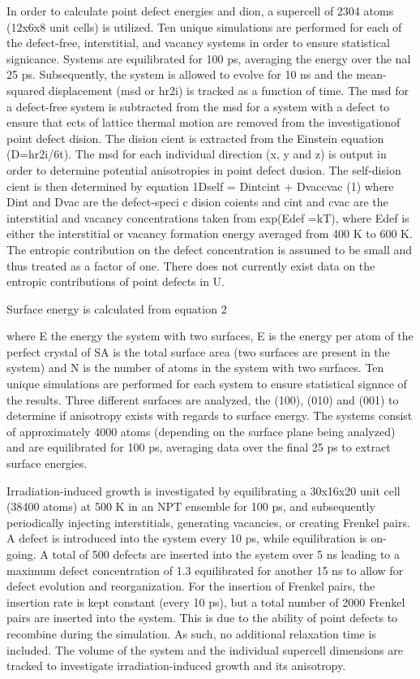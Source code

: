 \documentclass[review]{elsarticle}
\begin{document}
In order to calculate point defect energies and dion, a supercell of 2304 atoms (12x6x8 unit cells) is utilized. Ten unique simulations are performed for each of the defect-free, interstitial, and vacancy systems in order to ensure statistical signicance. Systems are equilibrated for 100 ps, averaging the energy over the nal 25 ps. Subsequently, the system is allowed to evolve for 10 ns and the mean-squared displacement (msd or hr2i) is tracked as a function of time. The msd for a defect-free system is subtracted from the msd for a system with a defect to ensure that ects of lattice thermal motion are removed from the investigationof point defect dision. The dision cient is extracted from the Einstein equation (D=hr2i/6t). The msd for each individual direction (x, y and z) is output in order to determine potential anisotropies in point defect dusion. The self-dision cient is then determined by equation 1Dself = Dintcint + Dvaccvac (1) where Dint and Dvac are the defect-speci c dision coients and cint and cvac are the interstitial and vacancy concentrations taken from exp(Edef =kT), where Edef is either the interstitial or vacancy formation energy averaged from 400 K to 600 K. The entropic contribution on the defect concentration is assumed to be small and thus treated as a factor of one. There does not currently exist data on the entropic contributions of point defects in U.

Surface energy is calculated from equation 2


where E the energy the system with two surfaces, E is the energy per atom of the perfect crystal
of SA is the total surface area (two surfaces are present in the system) and N is the number of
atoms in the system with two surfaces. Ten unique simulations are performed for each system to ensure
statistical signnce of the results. Three different surfaces are analyzed, the (100), (010) and (001) to
determine if anisotropy exists with regards to surface energy. The systems consist of approximately 4000
atoms (depending on the surface plane being analyzed) and are equilibrated for 100 ps, averaging data over
the final 25 ps to extract surface energies.

Irradiation-induced growth is investigated by equilibrating a 30x16x20 unit cell (38400 atoms) at 500 K
in an NPT ensemble for 100 ps, and subsequently periodically injecting interstitials, generating vacancies,
or creating Frenkel pairs. A defect is introduced into the system every 10 ps, while equilibration is on-going.
A total of 500 defects are inserted into the system over 5 ns leading to a maximum defect concentration
of 1.3%
equilibrated for another 15 ns to allow for defect evolution and reorganization. For the insertion of Frenkel
pairs, the insertion rate is kept constant (every 10 ps), but a total number of 2000 Frenkel pairs are inserted
into the system. This is due to the ability of point defects to recombine during the simulation. As such, no
additional relaxation time is included. The volume of the system and the individual supercell dimensions
are tracked to investigate irradiation-induced growth and its anisotropy.
\end{document}
